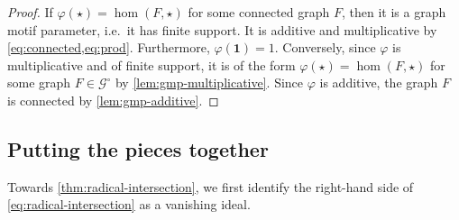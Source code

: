 \documentclass[11pt]{scrartcl}
\theoremstyle{definition}
\theoremstyle{plain}
\theoremstyle{remark}
\renewcommand\phi\varphi
\newcommand{\lG}{\mathcal{G}^\circ}
\begin{document}
	\thmSemiringHomChar*
	\begin{proof}
		If $\phi(\star) = \hom(F, \star)$ for some connected graph $F$,
		then it is a graph motif parameter, i.e.\ it has finite support.
		It is additive and multiplicative by \cref{eq:connected,eq:prod}.
		Furthermore, $\phi(\boldsymbol{1}) = 1$.
		Conversely,
		since $\phi$ is multiplicative and of finite support,
		it is of the form $\phi(\star) = \hom(F, \star)$ for some graph $F\in \lG$ by \cref{lem:gmp-multiplicative}.
		Since $\phi$ is additive,
		the graph $F$ is connected by \cref{lem:gmp-additive}.
	\end{proof}

	\subsection{Putting the pieces together}

	\label{sec:pieces}

	Towards \cref{thm:radical-intersection},
	we first identify the right-hand side of \eqref{eq:radical-intersection} as a vanishing ideal.
\end{document}
